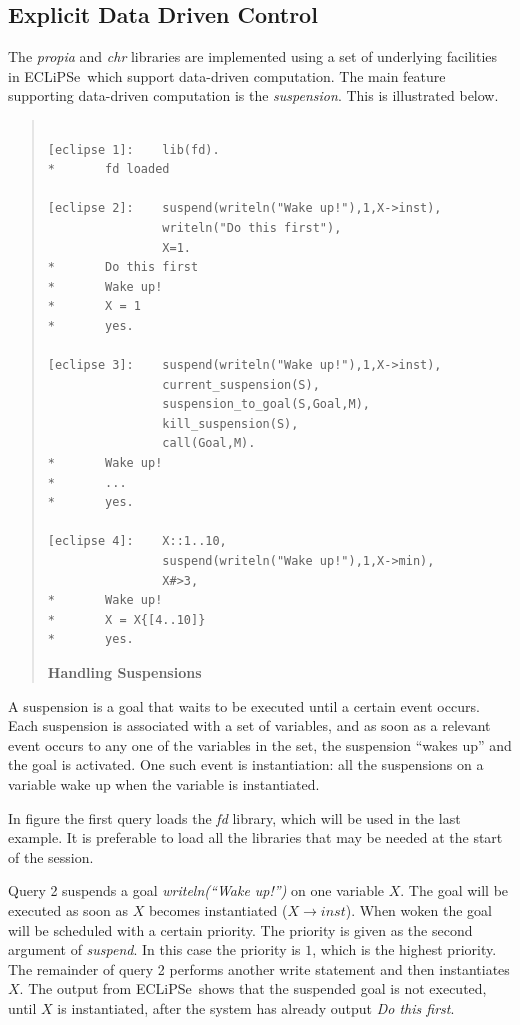 \documentclass[a4wide]{article}
\newcommand{\ECL}{\mbox{ECLiPSe\ }{\hspace{1mm}}}
\begin{document}
\subsection{Explicit Data Driven Control}
The {\em propia} and {\em chr} libraries are implemented using a set
of underlying facilities in \ECL which support data-driven computation.
The main feature supporting data-driven computation is the {\em
suspension}. 
This is illustrated below.
\begin{quote}
\begin{verbatim}

[eclipse 1]:    lib(fd).
*       fd loaded

[eclipse 2]:    suspend(writeln("Wake up!"),1,X->inst),
                writeln("Do this first"), 
                X=1.
*       Do this first
*       Wake up!
*       X = 1
*       yes.

[eclipse 3]:    suspend(writeln("Wake up!"),1,X->inst),
                current_suspension(S),
                suspension_to_goal(S,Goal,M),
                kill_suspension(S),
                call(Goal,M).
*       Wake up!
*       ...
*       yes.

[eclipse 4]:    X::1..10,
                suspend(writeln("Wake up!"),1,X->min),
                X#>3,
*       Wake up!
*       X = X{[4..10]}
*       yes.

\end{verbatim}
{\bf Handling Suspensions}
\label{suspensions}
\end{quote}

A suspension is a goal that waits to be executed until a
certain event occurs.
Each suspension is associated with a set of variables, and as soon as
a relevant event occurs to any one of the variables in the set, the
suspension ``wakes up'' and the goal is activated.
One such event is instantiation: all the suspensions on a variable
wake up when the variable is instantiated.

In figure \pageref{suspensions} the first query loads the {\em fd}
library, which will be used in 
the last example.  
It is preferable to load all the libraries that may be needed at the
start of the session.

Query 2 suspends a goal {\em writeln(``Wake up!'')} on one variable
$X$.  The goal will be executed as soon as $X$ becomes instantiated
($ X \rightarrow inst$).  When woken the goal will be scheduled with a
certain priority. The priority is given as the second argument of {\em
suspend}.  In this case the priority is $1$, which is the highest
priority. 
The remainder of query 2 performs another write statement and then
instantiates $X$. 
The output from \ECL shows that the suspended goal is not executed,
until $X$ is instantiated, after the system has already output {\em Do
this first}.
\end{document}

